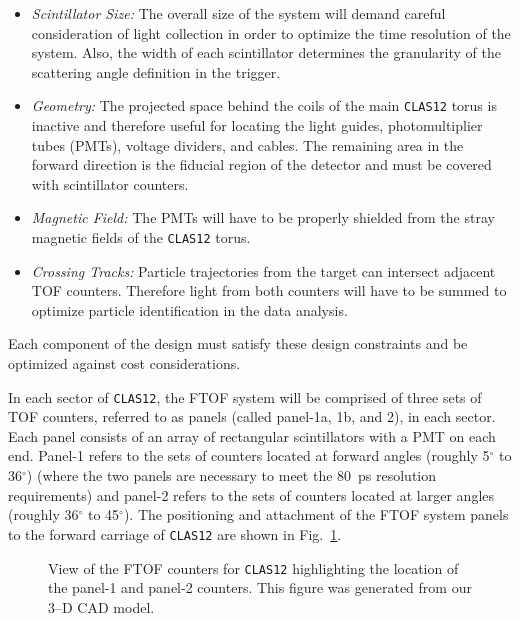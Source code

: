\begin{itemize}

\item {\it Scintillator Size:} The overall size of the system will demand 
careful consideration of light collection in order to optimize the time 
resolution of the system.  Also, the width of each scintillator determines
the granularity of the scattering angle definition in the trigger.

\item {\it Geometry:} The projected space behind the coils of the main
{\tt CLAS12} torus is inactive and therefore useful for locating the
light guides, photomultiplier tubes (PMTs), voltage dividers, and cables.  
The remaining area in the forward direction is the fiducial region of the 
detector and must be covered with scintillator counters.

\item {\it Magnetic Field:} The PMTs will have to be properly shielded
from the stray magnetic fields of the {\tt CLAS12} torus.

\item {\it Crossing Tracks:} Particle trajectories from the target can
intersect adjacent TOF counters.  Therefore light from both counters
will have to be summed to optimize particle identification in the data
analysis.

\end{itemize}

Each component of the design must satisfy these design constraints and be
optimized against cost considerations.

In each sector of {\tt CLAS12}, the FTOF system will be comprised of three 
sets of TOF counters, referred to as panels (called panel-1a, 1b, and 2),
in each sector.  Each panel consists of an array of rectangular scintillators
with a PMT on each end.  Panel-1 refers to the sets of counters located at 
forward angles (roughly 5$^\circ$ to 36$^\circ$) (where the two panels are
necessary to meet the 80~ps resolution requirements) and panel-2 refers to 
the sets of counters located at larger angles (roughly 36$^\circ$ to 
45$^\circ$).  The positioning and attachment of the FTOF system panels to 
the forward carriage of {\tt CLAS12} are shown in Fig.~\ref{fwd_car}.

\begin{figure}[htbp]
\vspace{9.0cm}
\caption{\small{View of the FTOF counters for {\tt CLAS12} highlighting
the location of the panel-1 and panel-2 counters.  This figure was generated
from our 3--D CAD model.}}
\label{fwd_car}
\end{figure}

